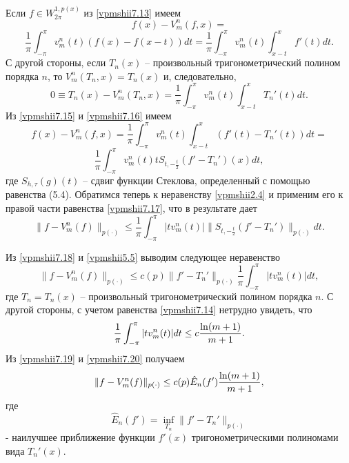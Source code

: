Если $f\in W^{1,p(x)}_{2\pi}$ из \eqref{vpmshii7.13} имеем
$$
f(x)-V_m^n(f,x)=
$$
\begin{equation}\label{vpmshii7.15}
  \frac1\pi\int_{-\pi}^\pi v_m^n(t)(f(x)-f(x-t))dt=  \frac1\pi\int_{-\pi}^\pi v_m^n(t)\int_{x-t}^xf'(t)dt.
\end{equation}
С другой стороны, если  $T_n(x)$ -- произвольный тригонометрический полином порядка $n$, то
$V_m^n(T_n,x)=T_n(x)$ и, следовательно,
 \begin{equation}\label{vpmshii7.16}
0 \equiv T_n(x)-V_m^n(T_n,x)=  \frac1\pi\int_{-\pi}^\pi v_m^n(t)\int_{x-t}^xT_n'(t)dt.
\end{equation}
Из \eqref{vpmshii7.15} и \eqref{vpmshii7.16} имеем
$$
f(x)-V_m^n(f,x)= \frac1\pi\int_{-\pi}^\pi v_m^n(t)\int_{x-t}^x(f'(t)-T_n'(t))dt=
$$
\begin{equation}\label{vpmshii7.17}
 \frac1\pi\int_{-\pi}^\pi v_m^n(t)tS_{t,-\frac{t}{2}}(f'-T_n')(x)dt,
\end{equation}
где $S_{h,\tau}(g)(t)$ -- сдвиг функции Стеклова, определенный с помощью равенства (5.4).
Обратимся теперь к неравенству \eqref{vpmshii2.4} и применим его к правой части равенства \eqref{vpmshii7.17}, что в результате дает
\begin{equation}\label{vpmshii7.18}
    \|f-V_m^n(f)\|_{p(\cdot)}\le \frac1\pi\int_{-\pi}^\pi |tv_m^n(t)|\|S_{t,-\frac{t}{2}}(f'-T_n')\|_{p(\cdot)} dt.
\end{equation}

Из \eqref{vpmshii7.18} и \eqref{vpmshii5.5} выводим следующее неравенство
\begin{equation}\label{vpmshii7.19}
    \|f-V_m^n(f)\|_{p(\cdot)}\le c(p)\|f'-T_n'\|_{p(\cdot)}\frac1\pi\int_{-\pi}^\pi |tv_m^n(t)|dt,
\end{equation}
где $T_n=T_n(x)$ -- произвольный тригонометрический полином порядка $n$. С другой стороны, с учетом равенства \eqref{vpmshii7.14} нетрудно увидеть, что
\begin{equation}\label{vpmshii7.20}
    \frac1\pi\int_{-\pi}^\pi |tv_m^n(t)|dt\le c{\ln(m+1)\over m+1}.
\end{equation}
Из \eqref{vpmshii7.19} и \eqref{vpmshii7.20} получаем
\begin{equation}\label{vpmshii7.21}
    \|f-V_m^n(f)\|_{p(\cdot)}\le c(p) {\hat E}_n(f'){\ln(m+1)\over m+1},
\end{equation}
где
\begin{equation}\label{vpmshii7.22}
    {\hat E}_n(f')=\inf_{T_n}\|f'-T_n'\|_{p(\cdot)}
\end{equation}
- наилучшее приближение функции $f'(x)$ тригонометрическими полиномами вида $T_n'(x)$.

